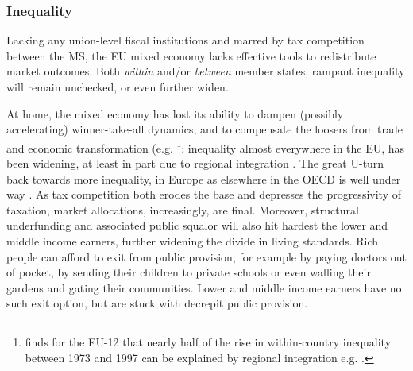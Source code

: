 \documentclass[11pt,a4paper,oneside,openright]{article}
\begin{document}

\subsubsection{Inequality} Lacking any union-level fiscal institutions and marred by tax competition between the \gls{MS}, the \gls{EU} mixed economy lacks effective tools to redistribute market outcomes. 
Both \emph{within} and/or \emph{between} member states, rampant inequality will remain unchecked, or even further widen.

At home, the mixed economy has lost its ability to dampen (possibly accelerating) winner-take-all dynamics, and to compensate the loosers from trade and economic transformation (e.g. \citealt{Beckfield2006}
	\footnote{
		\citeauthor{Beckfield2006} finds for the \gls{EU}-12 that nearly half of the rise in within-country inequality between 1973 and 1997 can be explained by regional integration e.g. \citeyearpar[979]{Beckfield2006}.
	}: 
inequality almost everywhere in the \gls{EU}, has been widening, at least in part due to regional integration \citep[e.g.][265]{DaudUngl2008}. 
The great U-turn back towards more inequality, in Europe as elsewhere in the \gls{OECD} is well under way \citep{AldersonNielsen-2002-aa}. 
As tax competition both erodes the base and depresses the progressivity of taxation, market allocations, increasingly, are final. 
Moreover, structural underfunding and associated public squalor will also hit hardest the lower and middle income earners, further widening the divide in living standards. 
Rich people can afford to exit from public provision, for example by paying doctors out of pocket, by sending their children to private schools or even walling their gardens and gating their communities. 
Lower and middle income earners have no such exit option, but are stuck with decrepit public provision.
\end{document}
